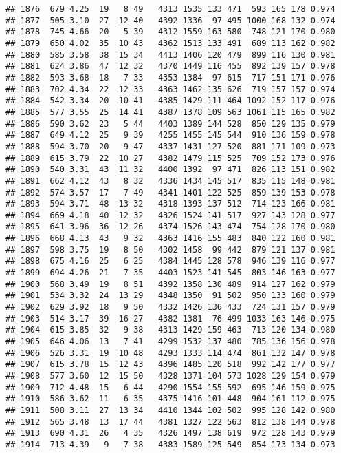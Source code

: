 \documentclass[]{article}
\begin{document}
\begin{verbatim}
## 1876  679 4.25  19   8 49   4313 1535 133 471  593 165 178 0.974
## 1877  505 3.10  27  12 40   4392 1336  97 495 1000 168 132 0.974
## 1878  745 4.66  20   5 39   4312 1559 163 580  748 121 170 0.980
## 1879  650 4.02  35  10 43   4362 1513 133 491  689 113 162 0.982
## 1880  585 3.58  38  15 34   4413 1406 120 479  899 116 130 0.981
## 1881  624 3.86  47  12 32   4370 1449 116 455  892 139 157 0.978
## 1882  593 3.68  18   7 33   4353 1384  97 615  717 151 171 0.976
## 1883  702 4.34  22  12 33   4363 1462 135 626  719 157 157 0.974
## 1884  542 3.34  20  10 41   4385 1429 111 464 1092 152 117 0.976
## 1885  577 3.55  25  14 41   4387 1378 109 563 1061 115 165 0.982
## 1886  590 3.62  23   5 44   4403 1389 144 528  850 129 135 0.979
## 1887  649 4.12  25   9 39   4255 1455 145 544  910 136 159 0.978
## 1888  594 3.70  20   9 47   4337 1431 127 520  881 171 109 0.973
## 1889  615 3.79  22  10 27   4382 1479 115 525  709 152 173 0.976
## 1890  540 3.31  43  11 32   4400 1392  97 471  826 113 151 0.982
## 1891  662 4.12  43   8 32   4336 1434 145 517  835 115 148 0.981
## 1892  574 3.57  17   7 49   4341 1401 122 525  859 139 153 0.978
## 1893  594 3.71  48  13 32   4318 1393 137 512  714 123 166 0.981
## 1894  669 4.18  40  12 32   4326 1524 141 517  927 143 128 0.977
## 1895  641 3.96  36  12 26   4374 1526 143 474  754 128 170 0.980
## 1896  668 4.13  43   9 32   4363 1416 155 483  840 122 160 0.981
## 1897  598 3.75  19   8 50   4302 1458  99 442  879 121 137 0.981
## 1898  675 4.16  25   6 25   4384 1445 128 578  946 139 116 0.977
## 1899  694 4.26  21   7 35   4403 1523 141 545  803 146 163 0.977
## 1900  568 3.49  19   8 51   4392 1358 130 489  914 127 162 0.979
## 1901  534 3.32  24  13 29   4348 1350  91 502  950 133 160 0.979
## 1902  629 3.92  18   9 50   4332 1426 136 433  724 131 157 0.979
## 1903  514 3.17  39  16 27   4382 1381  76 499 1033 163 146 0.975
## 1904  615 3.85  32   9 38   4313 1429 159 463  713 120 134 0.980
## 1905  646 4.06  13   7 41   4299 1532 137 480  785 136 156 0.978
## 1906  526 3.31  19  10 48   4293 1333 114 474  861 132 147 0.978
## 1907  615 3.78  15  12 43   4396 1485 120 518  992 142 177 0.977
## 1908  577 3.60  12  15 50   4328 1371 104 573 1028 129 154 0.979
## 1909  712 4.48  15   6 44   4290 1554 155 592  695 146 159 0.975
## 1910  586 3.62  11   6 35   4375 1416 101 448  904 161 112 0.975
## 1911  508 3.11  27  13 34   4410 1344 102 502  995 128 142 0.980
## 1912  565 3.48  13  17 44   4381 1327 122 563  812 138 144 0.978
## 1913  690 4.31  26   4 35   4326 1497 138 619  972 128 143 0.979
## 1914  713 4.39   9   7 38   4383 1589 125 549  854 173 134 0.973

\end{verbatim}
\end{document}
